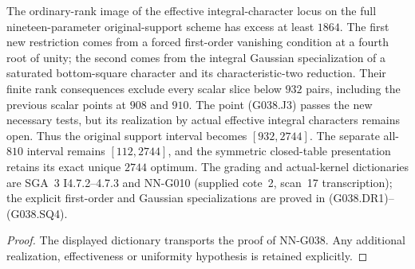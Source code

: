 \begin{geometricstatement}[NN-G038]
The ordinary-rank image of the effective integral-character
locus on the full nineteen-parameter original-support scheme
has excess at least $1864$.  The first new restriction comes
from a forced first-order vanishing condition at a fourth root
of unity; the second comes from the integral Gaussian
specialization of a saturated bottom-square character and its
characteristic-two reduction.  Their finite rank consequences
exclude every scalar slice below $932$ pairs, including the
previous scalar points at $908$ and $910$.  The point (G038.J3)
passes the new necessary tests, but its realization by actual
effective integral characters remains open.  Thus the original
support interval becomes $[932,2744]$.  The separate all-$810$
interval remains $[112,2744]$, and the symmetric closed-table
presentation retains its exact unique $2744$ optimum.
The grading and actual-kernel dictionaries are SGA~3
I4.7.2--4.7.3 and NN-G010 (supplied cote~2, scan~17
transcription); the explicit first-order and Gaussian
specializations are proved in (G038.DR1)--(G038.SQ4).


\end{geometricstatement}
\begin{proof} The displayed dictionary transports the proof of NN-G038. Any additional realization, effectiveness or uniformity hypothesis is retained explicitly.\end{proof}


